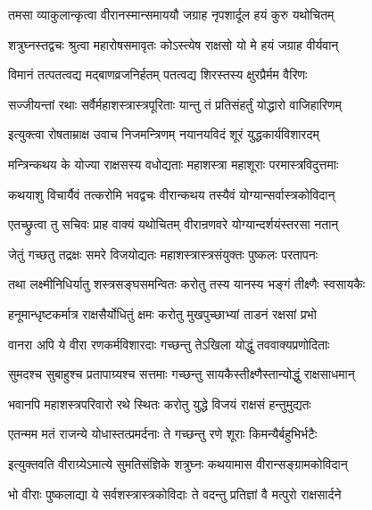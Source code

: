 \twolineshloka
{तमसा व्याकुलान्कृत्वा वीरानस्मान्समाययौ}
{जग्राह नृपशार्दूल हयं कुरु यथोचितम्}%

\twolineshloka
{शत्रुघ्नस्तद्वचः श्रुत्वा महारोषसमावृतः}
{कोऽस्त्येष राक्षसो यो मे हयं जग्राह वीर्यवान्}%

\twolineshloka
{विमानं तत्पतत्वद्य मद्बाणव्रजनिर्हतम्}
{पतत्वद्य शिरस्तस्य क्षुरप्रैर्मम वैरिणः}%

\twolineshloka
{सज्जीयन्तां रथाः सर्वैर्महाशस्त्रास्त्रपूरिताः}
{यान्तु तं प्रतिसंहर्तुं योद्धारो वाजिहारिणम्}%

\twolineshloka
{इत्युक्त्वा रोषताम्राक्ष उवाच निजमन्त्रिणम्}
{नयानयविदं शूरं युद्धकार्यविशारदम्}%


\twolineshloka
{मन्त्रिन्कथय के योज्या राक्षसस्य वधोद्यताः}
{महाशस्त्रा महाशूराः परमास्त्रविदुत्तमाः}%

\twolineshloka
{कथयाशु विचार्यैवं तत्करोमि भवद्वचः}
{वीरान्कथय तस्यैवं योग्यान्सर्वास्त्रकोविदान्}%

\twolineshloka
{एतच्छ्रुत्वा तु सचिवः प्राह वाक्यं यथोचितम्}
{वीरान्रणवरे योग्यान्दर्शयंस्तरसा नतान्}%


\twolineshloka
{जेतुं गच्छतु तद्रक्षः समरे विजयोद्यतः}
{महाशस्त्रास्त्रसंयुक्तः पुष्कलः परतापनः}%

\twolineshloka
{तथा लक्ष्मीनिधिर्यातु शस्त्रसङ्घसमन्वितः}
{करोतु तस्य यानस्य भङ्गं तीक्ष्णैः स्वसायकैः}%

\twolineshloka
{हनूमान्धृष्टकर्मात्र राक्षसैर्योधितुं क्षमः}
{करोतु मुखपुच्छाभ्यां ताडनं रक्षसां प्रभो}%

\twolineshloka
{वानरा अपि ये वीरा रणकर्मविशारदाः}
{गच्छन्तु तेऽखिला योद्धुं तववाक्यप्रणोदिताः}%

\twolineshloka
{सुमदश्च सुबाहुश्च प्रतापाग्र्यश्च सत्तमाः}
{गच्छन्तु सायकैस्तीक्ष्णैस्तान्योद्धुं राक्षसाधमान्}%

\twolineshloka
{भवानपि महाशस्त्रपरिवारो रथे स्थितः}
{करोतु युद्धे विजयं राक्षसं हन्तुमुद्यतः}%

\twolineshloka
{एतन्मम मतं राजन्ये योधास्तत्प्रमर्दनाः}
{ते गच्छन्तु रणे शूराः किमन्यैर्बहुभिर्भटैः}%

\twolineshloka
{इत्युक्तवति वीराग्र्येऽमात्ये सुमतिसंज्ञिके}
{शत्रुघ्नः कथयामास वीरान्सङ्ग्रामकोविदान्}%

\twolineshloka
{भो वीराः पुष्कलाद्या ये सर्वशस्त्रास्त्रकोविदाः}
{ते वदन्तु प्रतिज्ञां वै मत्पुरो राक्षसार्दने}%

